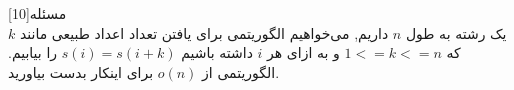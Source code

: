 ‌مسئله[10]  
\\
یک رشته به طول $n$  داریم, می‌خواهیم الگوریتمی برای یافتن تعداد اعداد طبیعی مانند $ k$  که $ 1<= k <= n$ و به ازای هر $i$ داشته باشیم $s(i)=s(i+k)$  را بیابیم. الگوریتمی از $o(n)$ برای اینکار بدست بیاورید.












